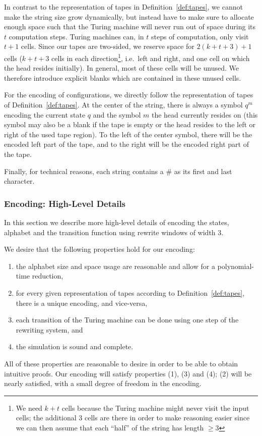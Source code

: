 \documentclass[a4paper,UKenglish,cleveref, autoref]{lipics-v2019}
\begin{document}
In contrast to the representation of tapes in Definition~\ref{def:tapes}, we cannot make the string size grow dynamically, but instead have to make sure to allocate enough space such that the Turing machine will never run out of space during its $t$ computation steps. Turing machines can, in $t$ steps of computation, only visit $t+1$ cells. Since our tapes are two-sided, we reserve space for $2(k + t + 3)+1$ cells ($k + t + 3$ cells in each direction\footnote{We need $k+t$ cells because the Turing machine might never visit the input cells; the additional 3 cells are there in order to make reasoning easier since we can then assume that each ``half'' of the string has length $\ge 3$}, i.e.\ left and right, and one cell on which the head resides initially).
In general, most of these cells will be unused. We therefore introduce explicit blanks \blank{} which are contained in these unused cells.

For the encoding of configurations, we directly follow the representation of tapes of Definition~\ref{def:tapes}.
At the center of the string, there is always a symbol $q^m$ encoding the current state $q$ and the symbol $m$ the head currently resides on (this symbol may also be a blank \blank{} if the tape is empty or the head resides to the left or right of the used tape region). 
To the left of the center symbol, there will be the encoded left part of the tape, and to the right will be the encoded right part of the tape. 

Finally, for technical reasons, each string contains a \# as its first and last character. 

\newcommand{\polneg}[1]{\overleftarrow{#1}}
\newcommand{\polpos}[1]{\overrightarrow{#1}}
\newcommand{\polneut}[1]{\overline{#1}}
\subsubsection{Encoding: High-Level Details}\label{sec:rewrules}
In this section we describe more high-level details of encoding the states, alphabet and the transition function using rewrite windows of width 3. 

We desire that the following properties hold for our encoding:
\begin{enumerate}
  \item the alphabet size and space usage are reasonable and allow for a polynomial-time reduction,
  \item for every given representation of tapes according to Definition~\ref{def:tapes}, there is a unique encoding, and vice-versa,
  \item each transition of the Turing machine can be done using one step of the rewriting system, and
  \item the simulation is sound and complete.
\end{enumerate}
All of these properties are reasonable to desire in order to be able to obtain intuitive proofs.
Our encoding will satisfy properties (1), (3) and (4); (2) will be nearly satisfied, with a small degree of freedom in the encoding.
\end{document}
